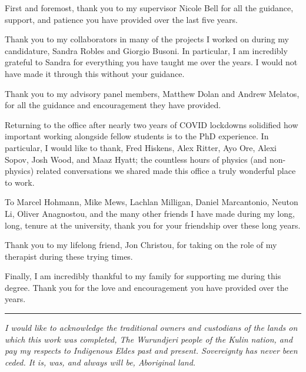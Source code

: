\begin{acknowledgements}

  First and foremost, thank you to my supervisor Nicole Bell for all the guidance, support, and patience you have provided over the last five years. 

  
  Thank you to my collaborators in many of the projects I worked on during my candidature, Sandra Robles and Giorgio Busoni. 
  In particular, I am incredibly grateful to Sandra for everything you have taught me over the years. I would not have made it through this without your guidance. 

  Thank you to my advisory panel members, Matthew Dolan and Andrew Melatos, for all the guidance and encouragement they have provided.


  Returning to the office after nearly two years of COVID lockdowns solidified how important working alongside fellow students is to the PhD experience. In particular, I would like to thank, Fred Hiskens, Alex Ritter, Ayo Ore, Alexi Sopov, Josh Wood, and Maaz Hyatt; the countless hours of physics (and non-physics) related conversations we shared made this office a truly wonderful place to work.
 
  To Marcel Hohmann, Mike Mews, Lachlan Milligan, Daniel Marcantonio, Neuton Li, Oliver Anagnostou, and the many other friends I have made during my long, long, tenure at the university, thank you for your friendship over these long years. 

  Thank you to my lifelong friend, Jon Christou, for taking on the role of my therapist during these trying times.

  Finally, I am incredibly thankful to my family for supporting me during this degree. Thank you for the love and encouragement you have provided over the years. 

  \vfill
  \noindent\rule{\textwidth}{0.5pt}
  \textit{I would like to acknowledge the traditional owners and custodians of the lands on which this work was completed, The Wurundjeri people of the Kulin nation, and pay my respects to Indigenous Eldes past and present. Sovereignty has never been ceded. It is, was, and always will be, Aboriginal land.}

\end{acknowledgements}
